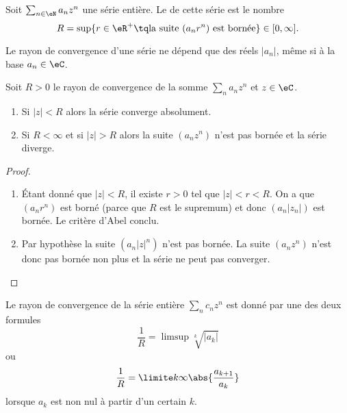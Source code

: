 \begin{definition}
    Soit \( \sum_{n\in \eN}a_nz^n\) une série entière. Le  de cette série est le nombre
    \begin{equation}
        R=\sup\{ r\in \eR^+\tq \text{la suite \((a_nr^n)\) est bornée} \}\in\mathopen[ 0 , \infty \mathclose].
    \end{equation}
\end{definition}
Le rayon de convergence d'une série ne dépend que des réels \( | a_n |\), même si à la base \( a_n\in \eC\).

\begin{theorem}
    Soit \( R>0\) le rayon de convergence de la somme \( \sum_na_nz^n\) et \( z\in \eC\).
    \begin{enumerate}
        \item
            Si \( | z |<R\) alors la série converge absolument.
        \item
            Si \( R<\infty\) et si \( | z |>R\) alors la suite \( (a_nz^n)\) n'est pas bornée et la série diverge.
    \end{enumerate}
\end{theorem}

\begin{proof}
    \begin{enumerate}
        \item
            Étant donné que \( | z |<R\), il existe \( r>0\) tel que \( | z |<r<R\). On a que \( (a_nr^n)\) est borné (parce que \( R\) est le supremum) et donc \( (a_n| z_n |)\) est bornée. Le critère d'Abel conclu.
        \item
            Par hypothèse la suite \( (a_n| z |^n)\) n'est pas bornée. La suite \( (a_nz^n)\) n'est donc pas bornée non plus et la série ne peut pas converger.
    \end{enumerate}
\end{proof}

\begin{theorem}		\label{ThoSerPuissRap}
Le rayon de convergence de la série entière \( \sum_n c_n z^n\) est donné par une des deux formules
\begin{equation}		\label{EqRayCOnvSer}
	\frac{1}{ R } =\limsup\sqrt[k]{| a_k |}
\end{equation}
ou
\begin{equation}		\label{EqAlphaSerPuissAtern}
	\frac{1}{ R }=\limite k \infty \abs{\frac{a_{k+1}}{a_k}}
\end{equation}
lorsque $a_k$ est non nul à partir d'un certain $k$.
\end{theorem}

